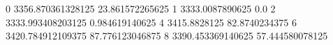 0 3356.870361328125 23.861572265625
1 3333.0087890625 0.0
2 3333.993408203125 0.984619140625
4 3415.8828125 82.8740234375
6 3420.784912109375 87.776123046875
8 3390.453369140625 57.444580078125
